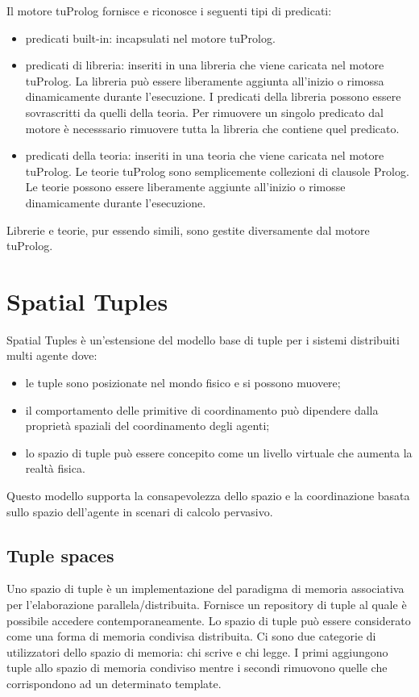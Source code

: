 \documentclass[12pt,a4paper,openright,twoside]{report}
\begin{document}
Il motore tuProlog fornisce e riconosce i seguenti tipi di predicati:
\begin{itemize}
  \item predicati built-in: incapsulati nel motore tuProlog.
  \item predicati di libreria: inseriti in una libreria che viene caricata nel motore tuProlog. La libreria pu\`o essere liberamente aggiunta all'inizio o rimossa dinamicamente durante l'esecuzione. I predicati della libreria possono essere sovrascritti da quelli della teoria. Per rimuovere un singolo predicato dal motore \`e necesssario rimuovere tutta la libreria che contiene quel predicato.
  \item predicati della teoria: inseriti in una teoria che viene caricata nel motore tuProlog. Le teorie tuProlog sono semplicemente collezioni di clausole Prolog. Le teorie possono essere liberamente aggiunte all'inizio o rimosse dinamicamente durante l'esecuzione.
\end{itemize}

Librerie e teorie, pur essendo simili, sono gestite diversamente dal motore tuProlog.

\chapter{Spatial Tuples}
Spatial Tuples \`e un'estensione del modello base di tuple per i sistemi distribuiti multi agente dove:
\begin{itemize}
   \item le tuple sono posizionate nel mondo fisico e si possono muovere;
   \item il comportamento delle primitive di coordinamento pu\`o dipendere dalla propriet\`a spaziali del coordinamento degli agenti;
   \item lo spazio di tuple pu\`o essere concepito come un livello virtuale che aumenta la realt\`a fisica.
\end{itemize}

Questo modello supporta la consapevolezza dello spazio e la coordinazione basata sullo spazio dell'agente in scenari di calcolo pervasivo.

\section{Tuple spaces}
Uno spazio di tuple \`e un implementazione del paradigma di memoria associativa per l'elaborazione parallela/distribuita. Fornisce un repository di tuple al quale \`e possibile accedere contemporaneamente. Lo spazio di tuple pu\`o essere considerato come una forma di memoria condivisa distribuita. Ci sono due categorie di utilizzatori dello spazio di memoria: chi scrive e chi legge. I primi aggiungono tuple allo spazio di memoria condiviso mentre i secondi rimuovono quelle che corrispondono ad un determinato template.
\end{document}
